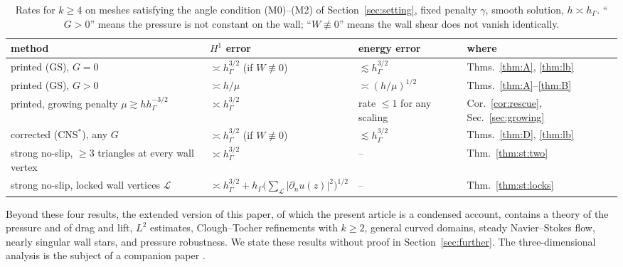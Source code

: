 \documentclass[pdflatex,sn-mathphys-num]{sn-jnl}
\theoremstyle{thmstyleone}
\theoremstyle{thmstylethree}
\newcommand{\hG}{h_\Gamma}
\newcommand{\dn}{\partial_n}
\newcommand{\GS}{\mathrm{GS}}
\newcommand{\CNS}{\mathrm{CNS}^\ast}
\newcommand{\Lk}{\mathcal L}
\begin{document}
\begin{table}[htb]
\centering\small
\caption{Rates for $k\ge4$ on meshes satisfying the angle condition (M0)--(M2) of Section~\ref{sec:setting}, fixed penalty $\gamma$, smooth solution, $h\asymp\hG$. ``$G>0$'' means the pressure is not constant on the wall; ``$W\not\equiv0$'' means the wall shear does not vanish identically.}\label{tab:summary}
\setlength{\tabcolsep}{3pt}
\begin{tabular}{>{\raggedright\arraybackslash}p{}>{\raggedright\arraybackslash}p{}>{\raggedright\arraybackslash}p{}>{\raggedright\arraybackslash}p{}}
\toprule
method & $H^1$ error & energy error & where\\
\midrule
printed ($\GS$), $G=0$ & $\asymp\hG^{3/2}$ (if $W\not\equiv0$) & $\lesssim\hG^{3/2}$ & Thms.~\ref{thm:A}, \ref{thm:lb}\\
printed ($\GS$), $G>0$ & $\asymp h/\mu$ & $\asymp(h/\mu)^{1/2}$ & Thms.~\ref{thm:A}--\ref{thm:B}\\
printed, growing penalty $\mu\gtrsim h\hG^{-3/2}$ & $\asymp\hG^{3/2}$ & rate $\le1$ for any scaling & Cor.~\ref{cor:rescue}, Sec.~\ref{sec:growing}\\
corrected ($\CNS$), any $G$ & $\asymp\hG^{3/2}$ (if $W\not\equiv0$) & $\lesssim\hG^{3/2}$ & Thms.~\ref{thm:D}, \ref{thm:lb}\\
strong no-slip, $\ge3$ triangles at every wall vertex & $\asymp\hG^{3/2}$ & -- & Thm.~\ref{thm:st:two}\\
strong no-slip, locked wall vertices $\Lk$ & $\asymp\hG^{3/2}+\hG\bigl(\sum_{\Lk}|\dn u(z)|^2\bigr)^{1/2}$ & -- & Thm.~\ref{thm:st:locks}\\
\bottomrule
\end{tabular}
\end{table}

Beyond these four results, the extended version \cite{PadhiExt} of this paper, of which the present article is a condensed account, contains a theory of the pressure and of drag and lift, $L^2$ estimates, Clough--Tocher refinements with $k\ge2$, general curved domains, steady Navier--Stokes flow, nearly singular wall stars, and pressure robustness. We state these results without proof in Section~\ref{sec:further}. The three-dimensional analysis is the subject of a companion paper \cite{PadhiThreeD}.
\end{document}
